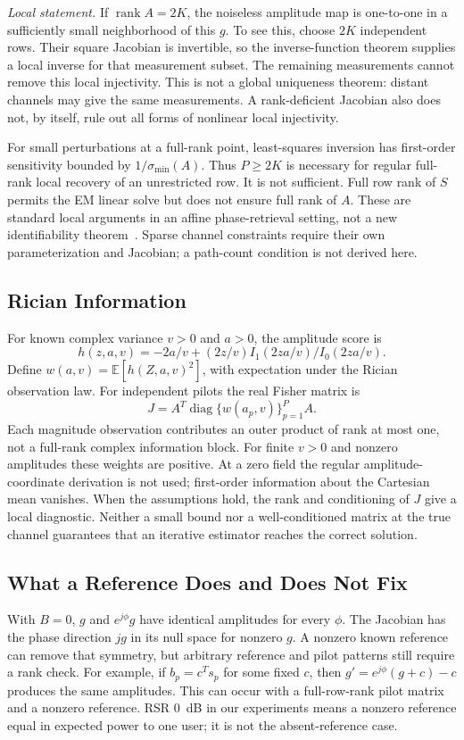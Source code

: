 \documentclass[journal]{IEEEtran}
\DeclareMathOperator{\diag}{diag}
\DeclareMathOperator{\rank}{rank}
\begin{document}
\textit{Local statement.} If $\rank A=2K$, the noiseless amplitude map
is one-to-one in a sufficiently small neighborhood of this $g$.
To see this, choose $2K$ independent rows. Their square Jacobian is
invertible, so the inverse-function theorem supplies a local inverse for
that measurement subset. The remaining measurements cannot remove this
local injectivity. This is not a global uniqueness theorem: distant
channels may give the same measurements. A rank-deficient Jacobian also
does not, by itself, rule out all forms of nonlinear local injectivity.

For small perturbations at a full-rank point, least-squares inversion has
first-order sensitivity bounded by $1/\sigma_{\min}(A)$.
Thus $P\ge2K$ is necessary for regular full-rank local recovery of an
unrestricted row. It is not sufficient. Full row rank of $S$ permits
the EM linear solve but does not ensure full rank of $A$. These are
standard local arguments in an affine phase-retrieval setting, not a new
identifiability theorem~\cite{gao2018}. Sparse channel constraints require their own
parameterization and Jacobian; a path-count condition is not derived here.

\subsection{Rician Information}
For known complex variance $v>0$ and $a>0$, the amplitude score is
\begin{equation}
 h(z,a,v)=-2a/v+(2z/v)I_1(2za/v)/I_0(2za/v).
\end{equation}
Define $w(a,v)=\mathbb E[h(Z,a,v)^2]$, with expectation under the
Rician observation law. For independent pilots the real Fisher matrix is
\begin{equation}
 J=A^T\diag\{w(a_p,v)\}_{p=1}^P A.
\end{equation}
Each magnitude observation contributes an outer product of rank at most one, not a
full-rank complex information block. For finite $v>0$ and nonzero
amplitudes these weights are positive. At a zero field the regular
amplitude-coordinate derivation is not used; first-order information
about the Cartesian mean vanishes. When the assumptions hold, the
rank and conditioning of $J$ give a local diagnostic. Neither a small
bound nor a well-conditioned matrix at the true channel guarantees that
an iterative estimator reaches the correct solution.

\subsection{What a Reference Does and Does Not Fix}
With $B=0$, $g$ and $e^{j\phi}g$ have identical amplitudes for every
$\phi$. The Jacobian has the phase direction $jg$ in its null space for
nonzero $g$. A nonzero known reference can remove that symmetry, but
arbitrary reference and pilot patterns still require a rank check. For
example, if $b_p=c^Ts_p$ for some fixed $c$, then
$g'=e^{j\phi}(g+c)-c$ produces the same amplitudes. This can occur
with a full-row-rank pilot matrix and a nonzero reference.
RSR $0$~dB in our experiments means a nonzero reference equal in expected
power to one user; it is not the absent-reference case.
\end{document}
